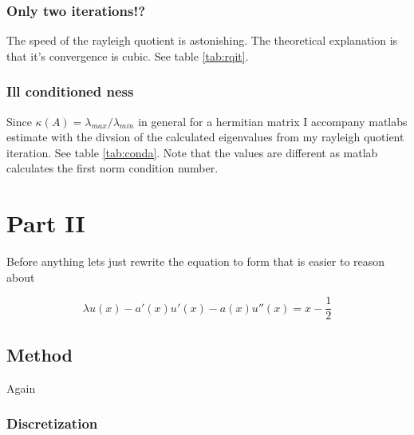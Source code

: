 \documentclass[a4paper,11pt]{article}
\begin{document}
\subsubsection{Only two iterations!?}

The speed of the rayleigh quotient is astonishing. The theoretical
explanation is that it's convergence is cubic. See table
\ref{tab:rqit}.

\subsubsection{Ill conditioned ness}

Since $\kappa(A) = \lambda_{max}/\lambda_{min}$ in general for a
hermitian matrix I accompany matlabs estimate with the divsion of the
calculated eigenvalues from my rayleigh quotient iteration. See table
\ref{tab:conda}. Note that the values are different as matlab calculates
the first norm condition number.



\section{Part II}

Before anything lets just rewrite the equation to form that is easier to
reason about

\[
  \lambda u(x) - a'(x)u'(x) - a(x)u''(x) = x - \frac{1}{2}
\]

\subsection{Method}

Again

\subsubsection{Discretization}
\end{document}
